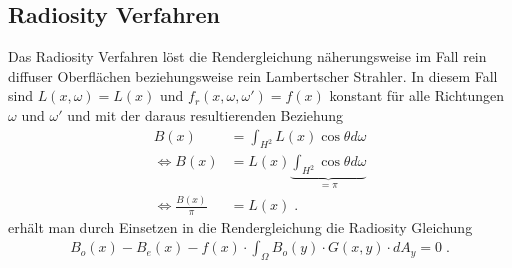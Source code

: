 \subsection{Radiosity Verfahren}
Das Radiosity Verfahren löst die Rendergleichung näherungsweise im Fall rein diffuser Oberflächen beziehungsweise rein Lambertscher Strahler. In diesem Fall sind  $L(x, \omega) = L(x)$ und $ f_r (x, \omega, \omega') = f(x)$ konstant  für alle  Richtungen $\omega$ und $\omega'$ und  mit der daraus resultierenden Beziehung  
\begin{align}
B(x) & = \int_{H^2} L(x) \cos{\theta} d\omega \\
\Leftrightarrow B(x) & =  L(x) \underbrace{\int_{H^2} \cos{\theta} d\omega}_{= \pi} \\
\Leftrightarrow \frac{B(x)}{\pi} & = L(x) \;.
\end{align}
erhält man durch Einsetzen in die Rendergleichung die Radiosity Gleichung
\begin{align}
B_o(x)   -B_e(x) - f (x) \cdot  \displaystyle \int_{\Omega}   B_o(y) \cdot G(x,y) \cdot   dA_y    =  0\; . 
\end{align}

